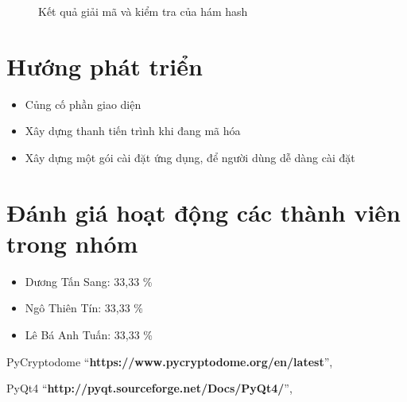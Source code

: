 \documentclass[a4paper]{article}
\begin{document}
\begin{itemize}
\begin{center}
\begin{figure}[H]
\begin{center}
    \end{center}
    \caption{Kết quả giải mã và kiểm tra của hám hash}
    \label{refhinh13}
    \end{figure}
\end{center}
\end{itemize}

\section{Hướng phát triển}

	\begin{itemize}
	  	\item
			Củng cố phần giao diện
	  	\item
			Xây dựng thanh tiến trình khi đang mã hóa
	  	\item
			Xây dựng một gói cài đặt ứng dụng, để người dùng dễ dàng cài đặt
	\end{itemize}


\section{Đánh giá hoạt động các thành viên trong nhóm}
	\begin{itemize}
		\item
		Dương Tấn Sang: 33,33 \%
		\item
		Ngô Thiên Tín: 33,33 \%
		\item
		Lê Bá Anh Tuấn: 33,33 \%
	\end{itemize}	
\newpage
\newpage


\begin{thebibliography}{80}


PyCryptodome
``\textbf{https://www.pycryptodome.org/en/latest}'', 


PyQt4
``\textbf{http://pyqt.sourceforge.net/Docs/PyQt4/}'', 



\end{thebibliography}
\end{document}
